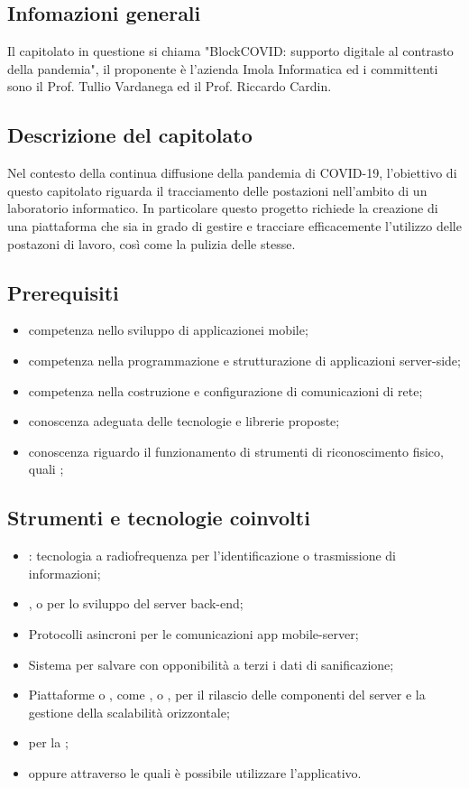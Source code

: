 
\subsection{Infomazioni generali}
Il capitolato in questione si chiama "BlockCOVID: supporto digitale al contrasto della pandemia", il proponente è l'azienda Imola Informatica ed i committenti sono il Prof. Tullio Vardanega ed il Prof. Riccardo Cardin.

\subsection{Descrizione del capitolato}
Nel contesto della continua diffusione della pandemia di COVID-19, l'obiettivo di questo capitolato riguarda il tracciamento delle postazioni nell'ambito di un laboratorio informatico. In particolare questo progetto richiede la creazione di una piattaforma che sia in grado di gestire e tracciare efficacemente l'utilizzo delle postazoni di lavoro, così come la pulizia delle stesse.

\subsection{Prerequisiti}
\begin{itemize}
\item competenza nello sviluppo di applicazionei mobile;
\item competenza nella programmazione e strutturazione di applicazioni server-side;
\item competenza nella costruzione e configurazione di comunicazioni di rete;
\item conoscenza adeguata delle tecnologie e librerie proposte;
\item conoscenza riguardo il funzionamento di strumenti di riconoscimento fisico, quali ;
\end{itemize}

\subsection{Strumenti e tecnologie coinvolti}
\begin{itemize}
\item {}: tecnologia a radiofrequenza per l'identificazione o trasmissione di informazioni;
\item {},  o  per lo sviluppo del server back-end;
\item Protocolli asincroni per le comunicazioni app mobile-server;
\item Sistema  per salvare con opponibilità a terzi i dati di sanificazione;
\item Piattaforme  o , come ,  o , per il rilascio delle componenti del server e la gestione della scalabilità orizzontale;
\item {} per la ;
\item {} oppure  attraverso le quali è possibile utilizzare l'applicativo.
\end{itemize}

